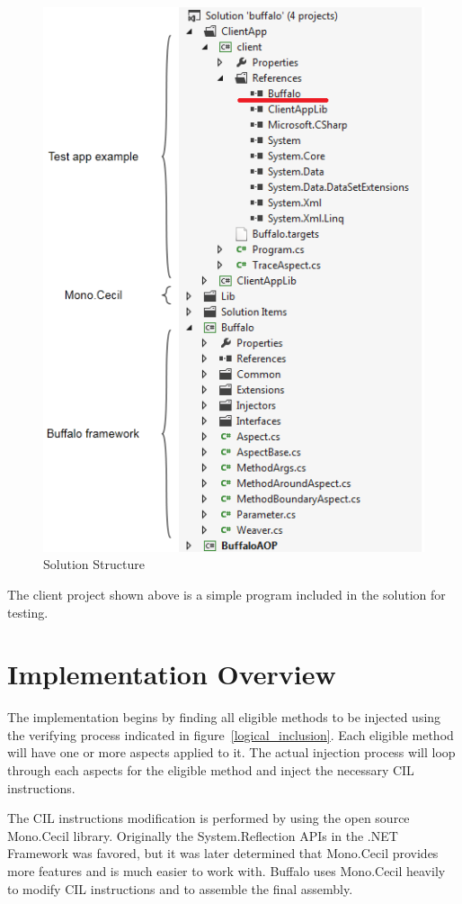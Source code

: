 \begin{figure}[H]
  \includegraphics[scale=1.0]{SolutionExplorer3.PNG}
  \centering
  \caption{Solution Structure\label{solutionexplorer}}
\end{figure}

The client project shown above is a simple program included in the solution for testing.

\section{Implementation Overview}

The implementation begins by finding all eligible methods to be injected using the verifying process indicated in figure~\ref{logical_inclusion}. Each eligible method will have one or more aspects applied to it. The actual injection process will loop through each aspects for the eligible method and inject the necessary CIL instructions.

The CIL instructions modification is performed by using the open source Mono.Cecil library. Originally the System.Reflection APIs in the .NET Framework was favored, but it was later determined that Mono.Cecil provides more features and is much easier to work with. Buffalo uses Mono.Cecil heavily to modify CIL instructions and to assemble the final assembly.

